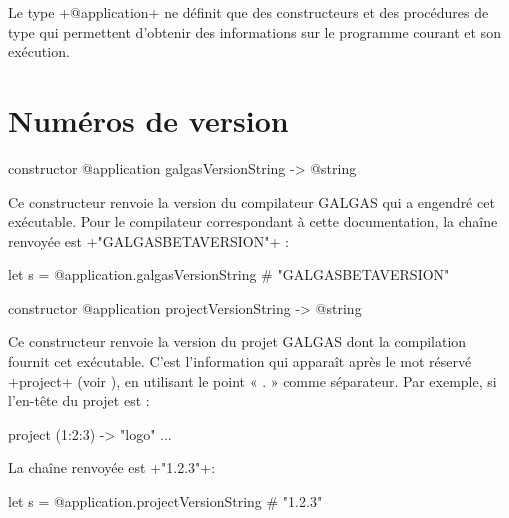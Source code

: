 



Le type \ggs+@application+ ne définit que des constructeurs et des procédures de type qui permettent d'obtenir des informations sur le programme courant et son exécution.


\section{Numéros de version}


\begin{galgasbox}
constructor @application galgasVersionString -> @string
\end{galgasbox}

Ce constructeur renvoie la version du compilateur GALGAS qui a engendré cet exécutable. Pour le compilateur correspondant à cette documentation, la chaîne renvoyée est \ggs+"GALGASBETAVERSION"+ :

\begin{galgas}
let s = @application.galgasVersionString # "GALGASBETAVERSION"
\end{galgas}









\begin{galgasbox}
constructor @application projectVersionString -> @string
\end{galgasbox}

Ce constructeur renvoie la version du projet GALGAS dont la compilation fournit cet exécutable. C'est l'information qui apparaît après le mot réservé \ggs+project+ (voir ), en utilisant le point « . » comme séparateur. Par exemple, si l'en-tête du projet est :

\begin{galgas}
project (1:2:3) -> "logo" {
  ...
}
\end{galgas}

La chaîne renvoyée est \ggs+"1.2.3"+:
\begin{galgas}
let s = @application.projectVersionString # "1.2.3"
\end{galgas}










